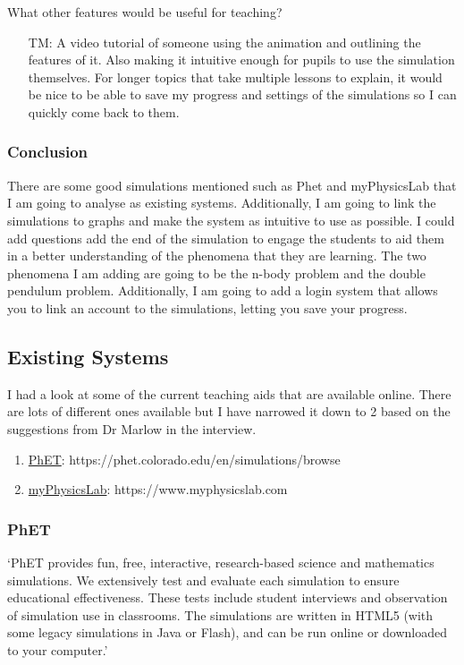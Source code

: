 \documentclass[12pt]{article}
\begin{document}
What other features would be useful for teaching?
\begin{itemize}
    \item[TM: ] A video tutorial of someone using the animation and outlining the features of it. Also making it intuitive enough for pupils to use the simulation themselves. For longer topics that take multiple lessons to explain, it would be nice to be able to save my progress and settings of the simulations so I can quickly come back to them.
\end{itemize}

\subsubsection{Conclusion}
There are some good simulations mentioned such as Phet and myPhysicsLab that I am going to analyse as existing systems. Additionally, I am going to link the simulations to graphs and make the system as intuitive to use as possible. I could add questions add the end of the simulation to engage the students to aid them in a better understanding of the phenomena that they are learning. The two phenomena I am adding are going to be the n-body problem and the double pendulum problem. Additionally, I am going to add a login system that allows you to link an account to the simulations, letting you save your progress.


\newpage
\subsection{Existing Systems}

I had a look at some of the current teaching aids that are available online. There are lots of different ones available but I have narrowed it down to 2 based on the suggestions from Dr Marlow in the interview.

\begin{enumerate}
\setlength\itemsep{-0.25em}
    \item \href{https://phet.colorado.edu/en/simulations/browse}{PhET}: https://phet.colorado.edu/en/simulations/browse
    \item \href{https://www.myphysicslab.com}{myPhysicsLab}: https://www.myphysicslab.com
\end{enumerate}

\subsubsection{PhET}
`PhET provides fun, free, interactive, research-based science and mathematics simulations. We extensively test and evaluate each simulation to ensure educational effectiveness. These tests include student interviews and observation of simulation use in classrooms. The simulations are written in HTML5 (with some legacy simulations in Java or Flash), and can be run online or downloaded to your computer.' \cite{aboutphet} \\
\end{document}
